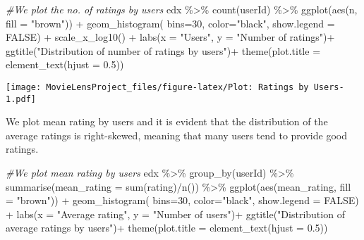\documentclass[
]{article}
\newenvironment{Shaded}{\begin{snugshade}}{\end{snugshade}}
\newcommand{\AttributeTok}[1]{\textcolor[rgb]{0.77,0.63,0.00}{#1}}
\newcommand{\CommentTok}[1]{\textcolor[rgb]{0.56,0.35,0.01}{\textit{#1}}}
\newcommand{\ConstantTok}[1]{\textcolor[rgb]{0.00,0.00,0.00}{#1}}
\newcommand{\DecValTok}[1]{\textcolor[rgb]{0.00,0.00,0.81}{#1}}
\newcommand{\FloatTok}[1]{\textcolor[rgb]{0.00,0.00,0.81}{#1}}
\newcommand{\FunctionTok}[1]{\textcolor[rgb]{0.00,0.00,0.00}{#1}}
\newcommand{\NormalTok}[1]{#1}
\newcommand{\SpecialCharTok}[1]{\textcolor[rgb]{0.00,0.00,0.00}{#1}}
\newcommand{\StringTok}[1]{\textcolor[rgb]{0.31,0.60,0.02}{#1}}
\begin{document}
\begin{Shaded}
\begin{Highlighting}[]
\CommentTok{\#We plot the no. of ratings by users}
\NormalTok{edx }\SpecialCharTok{\%\textgreater{}\%} 
  \FunctionTok{count}\NormalTok{(userId) }\SpecialCharTok{\%\textgreater{}\%} 
  \FunctionTok{ggplot}\NormalTok{(}\FunctionTok{aes}\NormalTok{(n, }\AttributeTok{fill =} \StringTok{"brown"}\NormalTok{)) }\SpecialCharTok{+} 
  \FunctionTok{geom\_histogram}\NormalTok{( }\AttributeTok{bins=}\DecValTok{30}\NormalTok{, }\AttributeTok{color=}\StringTok{"black"}\NormalTok{, }\AttributeTok{show.legend =} \ConstantTok{FALSE}\NormalTok{) }\SpecialCharTok{+}
  \FunctionTok{scale\_x\_log10}\NormalTok{() }\SpecialCharTok{+}
  \FunctionTok{labs}\NormalTok{(}\AttributeTok{x =} \StringTok{"Users"}\NormalTok{, }\AttributeTok{y =} \StringTok{"Number of ratings"}\NormalTok{)}\SpecialCharTok{+}
  \FunctionTok{ggtitle}\NormalTok{(}\StringTok{"Distribution of number of ratings by users"}\NormalTok{)}\SpecialCharTok{+}
  \FunctionTok{theme}\NormalTok{(}\AttributeTok{plot.title =} \FunctionTok{element\_text}\NormalTok{(}\AttributeTok{hjust =} \FloatTok{0.5}\NormalTok{))}
\end{Highlighting}
\end{Shaded}

\texttt{[image: MovieLensProject\_files/figure-latex/Plot: Ratings by Users-1.pdf]}

We plot mean rating by users and it is evident that the distribution of
the average ratings is right-skewed, meaning that many users tend to
provide good ratings.

\begin{Shaded}
\begin{Highlighting}[]
\CommentTok{\#We plot mean rating by users}
\NormalTok{edx }\SpecialCharTok{\%\textgreater{}\%} \FunctionTok{group\_by}\NormalTok{(userId) }\SpecialCharTok{\%\textgreater{}\%}
  \FunctionTok{summarise}\NormalTok{(}\AttributeTok{mean\_rating =} \FunctionTok{sum}\NormalTok{(rating)}\SpecialCharTok{/}\FunctionTok{n}\NormalTok{()) }\SpecialCharTok{\%\textgreater{}\%}
  \FunctionTok{ggplot}\NormalTok{(}\FunctionTok{aes}\NormalTok{(mean\_rating, }\AttributeTok{fill =} \StringTok{"brown"}\NormalTok{)) }\SpecialCharTok{+}
  \FunctionTok{geom\_histogram}\NormalTok{( }\AttributeTok{bins=}\DecValTok{30}\NormalTok{, }\AttributeTok{color=}\StringTok{"black"}\NormalTok{, }\AttributeTok{show.legend =} \ConstantTok{FALSE}\NormalTok{) }\SpecialCharTok{+}
  \FunctionTok{labs}\NormalTok{(}\AttributeTok{x =} \StringTok{"Average rating"}\NormalTok{, }\AttributeTok{y =} \StringTok{"Number of users"}\NormalTok{)}\SpecialCharTok{+}
  \FunctionTok{ggtitle}\NormalTok{(}\StringTok{"Distribution of average ratings by users"}\NormalTok{)}\SpecialCharTok{+}
  \FunctionTok{theme}\NormalTok{(}\AttributeTok{plot.title =} \FunctionTok{element\_text}\NormalTok{(}\AttributeTok{hjust =} \FloatTok{0.5}\NormalTok{))}
\end{Highlighting}
\end{Shaded}
\end{document}
